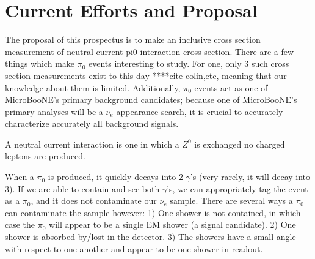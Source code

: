 \documentclass[12pt]{article}
\begin{document}
\section{Current Efforts and Proposal}
\par The proposal of this prospectus is to make an inclusive cross section measurement of neutral current pi0 interaction cross section. There are a few things which make $\pi_0$ events interesting to study.  For one, only 3 such cross section measurements exist to this day ****cite colin,etc, meaning that our knowledge about them is limited.  Additionally, $\pi_0$ events act as one of MicroBooNE's primary background candidates; because one of MicroBooNE's primary analyses will be a $\nu_e$ appearance search, it is crucial to accurately characterize accurately all background signals.
\par A neutral current interaction is one in which a $Z^0$ is exchanged no charged leptons are produced.
\par When a $\pi_0$ is produced, it quickly decays into 2 $\gamma$'s (very rarely, it will decay into 3).  If we are able to contain and see both $\gamma$'s, we can appropriately tag the event as a $\pi_0$, and it does not contaminate our $\nu_e$ sample. There are several ways a $\pi_0$ can contaminate the sample however:
1) One shower is not contained, in which case the $\pi_0$ will appear to be a single EM shower (a signal candidate).
2) One shower is absorbed by/lost in the detector.
3) The showers have a small angle with respect to one another and appear to be one shower in readout.
\end{document}
